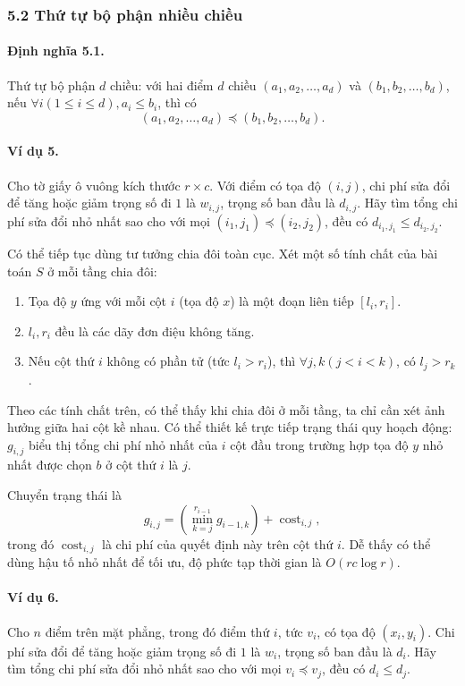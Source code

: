 \documentclass[11pt]{article}
\begin{document}
\subsubsection*{5.2 Thứ tự bộ phận nhiều chiều}

\paragraph{Định nghĩa 5.1.}
Thứ tự bộ phận \(d\) chiều: với hai điểm \(d\) chiều
\((a_1,a_2,\ldots,a_d)\) và \((b_1,b_2,\ldots,b_d)\), nếu
\(\forall i(1\le i\le d),a_i\le b_i\), thì có
\[
  (a_1,a_2,\ldots,a_d)\preceq(b_1,b_2,\ldots,b_d).
\]

\paragraph{Ví dụ 5.}
Cho tờ giấy ô vuông kích thước \(r\times c\). Với điểm có tọa độ \((i,j)\), chi
phí sửa đổi để tăng hoặc giảm trọng số đi \(1\) là \(w_{i,j}\), trọng số ban
đầu là \(d_{i,j}\). Hãy tìm tổng chi phí sửa đổi nhỏ nhất sao cho với mọi
\((i_1,j_1)\preceq(i_2,j_2)\), đều có \(d_{i_1,j_1}\le d_{i_2,j_2}\).

Có thể tiếp tục dùng tư tưởng chia đôi toàn cục. Xét một số tính chất của bài
toán \(S\) ở mỗi tầng chia đôi:
\begin{enumerate}
  \item Tọa độ \(y\) ứng với mỗi cột \(i\) (tọa độ \(x\)) là một đoạn liên tiếp
  \([l_i,r_i]\).
  \item \(l_i,r_i\) đều là các dãy đơn điệu không tăng.
  \item Nếu cột thứ \(i\) không có phần tử (tức \(l_i>r_i\)), thì
  \(\forall j,k(j<i<k)\), có \(l_j>r_k\).
\end{enumerate}

Theo các tính chất trên, có thể thấy khi chia đôi ở mỗi tầng, ta chỉ cần xét
ảnh hưởng giữa hai cột kề nhau. Có thể thiết kế trực tiếp trạng thái quy hoạch
động: \(g_{i,j}\) biểu thị tổng chi phí nhỏ nhất của \(i\) cột đầu trong trường
hợp tọa độ \(y\) nhỏ nhất được chọn \(b\) ở cột thứ \(i\) là \(j\).

Chuyển trạng thái là
\[
  g_{i,j}=\left(\min_{k=j}^{r_{i-1}} g_{i-1,k}\right)+\operatorname{cost}_{i,j},
\]
trong đó \(\operatorname{cost}_{i,j}\) là chi phí của quyết định này trên cột
thứ \(i\). Dễ thấy có thể dùng hậu tố nhỏ nhất để tối ưu, độ phức tạp thời gian
là \(O(rc\log r)\).

\paragraph{Ví dụ 6.}
Cho \(n\) điểm trên mặt phẳng, trong đó điểm thứ \(i\), tức \(v_i\), có tọa độ
\((x_i,y_i)\). Chi phí sửa đổi để tăng hoặc giảm trọng số đi \(1\) là \(w_i\),
trọng số ban đầu là \(d_i\). Hãy tìm tổng chi phí sửa đổi nhỏ nhất sao cho với
mọi \(v_i\preceq v_j\), đều có \(d_i\le d_j\).
\end{document}
